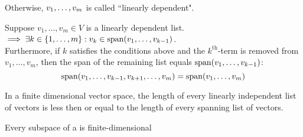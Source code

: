 \begin{mydef} 
  Otherwise, $v_1, \dots, v_m$ is called ``linearly dependent".
\end{mydef}




\setcounter{thm}{18}
\begin{thm} 
  \label{linear-dependence-lemma}
  Suppose $v_{1}, \dots, v_{m}\in V$ is a linearly dependent list.
  $\implies \exists k \in \{ 1, \dots, m \} : v_k \in \operatorname{span} (v_1, \dots, v_{k-1})$. \\
  Furthermore, if $k$ satisfies the conditions above and the $k^{\text{th}}$-term is removed from $v_1, \dots, v_m$, then the span of the remaining list equals $\operatorname{span} (v_1, \dots, v_{k-1})$:
  \begin{equation}
    \operatorname{span} (v_1, \dots, v_{k-1}, v_{k+1}, \dots, v_m) = \operatorname{span} (v_1, \dots, v_m)
  \end{equation}
\end{thm}

\setcounter{thm}{21}

\begin{thm}  
  \label{length-of-linearly-dependent-list-less-or-equal-length-of-spanning-list}
  In a finite dimensional vector space, the length of every linearly independent list of vectors is less then or equal to the length of every spanning list of vectors.
\end{thm}

\setcounter{thm}{24}
\begin{thm} 
  Every subspace of a \findimvs is finite-dimensional
\end{thm}
